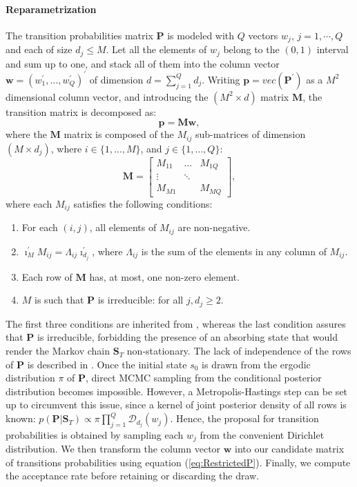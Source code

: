 \documentclass[final,3p,authoryear]{elsarticle}
\begin{document}
\paragraph{Reparametrization} The transition probabilities matrix $\mathbf{P}$ is modeled with $Q$ vectors $w_j$, $j=1,\cdots,Q$ and each of size $d_j \leq M$. Let all the elements of $w_j$ belong to the $(0,1)$ interval and sum up to one, and stack all of them into the column vector $\mathbf{w}=(w_1^{'}, \dots, w_Q^{'})^{'}$ of dimension $d=\sum_{j=1}^{Q}d_j$. Writing $\mathbf{p}=vec(\mathbf{P}^{'})$ as a $M^2$ dimensional column vector, and introducing the $(M^2 \times d)$ matrix $\mathbf{M}$, the transition matrix is decomposed as:
\begin{equation}\label{eq:RestrictedP}
\mathbf{p} = \mathbf{M} \mathbf{w}, 
\end{equation} 
where the $\mathbf{M}$ matrix is composed of the $M_{ij}$ sub-matrices of dimension $(M \times d_j)$, where $i\in\{1,\dots,M\}$, and $j\in\{1,\dots,Q\}$:
\begin{equation}
    \mathbf{M} = \begin{bmatrix} M_{11} & \dots & M_{1Q} \\ \vdots & \ddots & \\ M_{M1} &  & M_{MQ} \end{bmatrix},
    \nonumber
\end{equation} 
where each $M_{ij}$ satisfies the following conditions:
\begin{enumerate}
	\item For each $(i,j)$, all elements of $M_{ij}$ are non-negative. 
	\item $ \imath_{M}^{'} M_{ij} = \Lambda_{ij} \imath_{d_j}^{'}$, where $\Lambda_{ij}$ is the sum of the elements in any column of $M_{ij}$.
	\item Each row of $\mathbf{M}$ has, at most, one non-zero element.
	\item $M$ is such that $\mathbf{P}$ is irreducible: for all $j, d_j \ge 2 $.
\end{enumerate}
 

The first three conditions are inherited from \cite{Sims2008}, whereas the last condition assures that $\mathbf{P}$ is irreducible, forbidding the presence of an absorbing state that would render the Markov chain $\mathbf{S}_T$ non-stationary. The lack of independence of the rows of $\mathbf{P}$ is described in \citet[][Section 11.5.5]{Fruhwirth-Schnatter2006}. Once the initial state $s_0$ is drawn from the ergodic distribution $\pi$ of $\mathbf{P}$, direct MCMC sampling from the conditional posterior distribution becomes impossible. However, a Metropolis-Hastings step can be set up to circumvent this issue, since a kernel of joint posterior density of all rows is known: $p(\mathbf{P}|\mathbf{S}_T ) \propto	\pi\prod_{j=1}^Q \mathcal{D}_{d_j}(w_j)$. Hence, the proposal for transition probabilities is obtained by sampling each $w_j$ from the convenient Dirichlet distribution. We then transform the column vector $\mathbf{w}$ into our candidate matrix of transitions probabilities using equation (\ref{eq:RestrictedP}). Finally, we compute the acceptance rate before retaining or discarding the draw.
\end{document}
